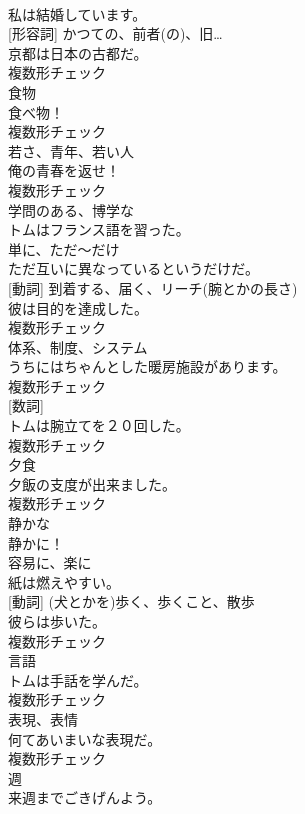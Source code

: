 \documentclass[8pt]{extreport}
\begin{document}
\begin{CJK}{UTF8}{min}
\\	私は結婚しています。	
\\	[名詞] [形容詞]	かつての、前者(の)、旧…	
\\	京都は日本の古都だ。	
\\	複数形チェック
\\	[名詞]	食物	
\\	食べ物！	
\\	複数形チェック
\\	[名詞]	若さ、青年、若い人	
\\	俺の青春を返せ！	
\\	複数形チェック
\\	[形容詞]	学問のある、博学な	
\\	トムはフランス語を習った。	
\\	[副詞]	単に、ただ〜だけ	
\\	ただ互いに異なっているというだけだ。	
\\	[名詞] [動詞]	到着する、届く、リーチ(腕とかの長さ)	
\\	彼は目的を達成した。	
\\	複数形チェック
\\	[名詞]	体系、制度、システム	
\\	うちにはちゃんとした暖房施設があります。	
\\	複数形チェック
\\	[名詞] [数詞]	
\\	トムは腕立てを２０回した。	
\\	複数形チェック
\\	[名詞]	夕食	
\\	夕飯の支度が出来ました。	
\\	複数形チェック
\\	[形容詞]	静かな	
\\	静かに！	
\\	[副詞]	容易に、楽に	
\\	紙は燃えやすい。	
\\	[名詞] [動詞]	(犬とかを)歩く、歩くこと、散歩	
\\	彼らは歩いた。	
\\	複数形チェック
\\	[名詞]	言語	
\\	トムは手話を学んだ。	
\\	複数形チェック
\\	[名詞]	表現、表情	
\\	何てあいまいな表現だ。	
\\	複数形チェック
\\	[名詞]	週	
\\	来週までごきげんよう。	

\end{CJK}
\end{document}

